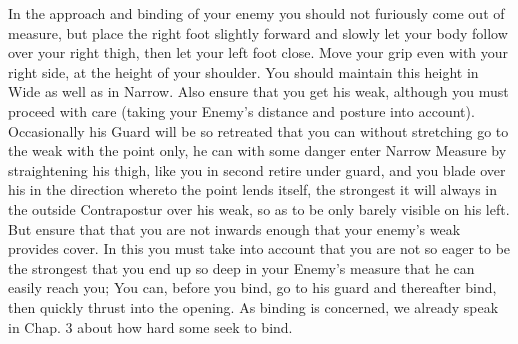 In the approach and binding of your enemy you should not furiously
come out of measure, but place the right foot slightly forward and
slowly let your body follow over your right thigh, then let your left
foot close. Move your grip even with your right side, at the height of
your shoulder. You should maintain this height in Wide as well as in
Narrow. Also ensure that you get his weak, although you must proceed
with care (taking your Enemy's distance and posture into
account).
Occasionally his Guard will be so retreated that you can without
stretching go to the weak with the point only, he can with some danger
enter Narrow Measure by straightening his thigh, like you in second
retire under guard, and you blade over his in the direction whereto
the point lends itself, the strongest it will always in the outside
Contrapostur over his weak, so as to be only barely visible on his
left. But ensure that that you are not inwards enough that your
enemy's weak provides cover. In this you must take into account that
you are not so eager to be the strongest that you end up so deep in
your Enemy's measure that he can easily reach you; You can, before you
bind, go to his guard and thereafter bind, then quickly thrust into
the opening. As binding is concerned, we already speak in
Chap$.$ 3 about how hard some seek to bind.


